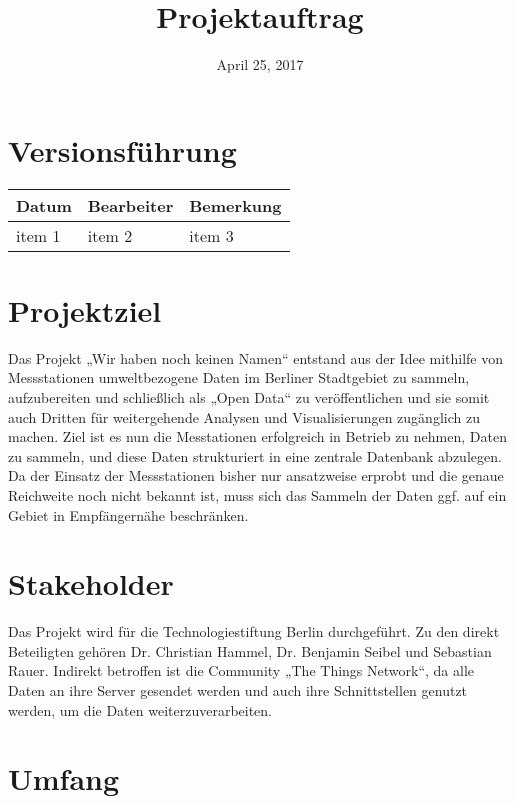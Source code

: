 \documentclass[
11pt,
a4paper,
ngerman,
tablecaptionabove
]{article}
\title{Projektauftrag}
\author{Mark Otto \and }
\date{April 25, 2017}
\begin{document}
\begin{titlepage}
\centering
\maketitle
\end{titlepage}

\tableofcontents
\listoffigures
\listoftables

\section{Versionsführung}
\begin{tabularx}{\textwidth}{ |X|X|X| }
  \hline
	\textbf{ Datum } & \textbf{ Bearbeiter } & \textbf{ Bemerkung } \\
  \hline 
  item 1  & item 2  & item 3 \\
  \hline
\end{tabularx}

\section{Projektziel}
Das Projekt „Wir haben noch keinen Namen“ entstand aus der Idee mithilfe von Messstationen umweltbezogene Daten im Berliner Stadtgebiet zu sammeln, aufzubereiten und schließlich als „Open Data“ zu veröffentlichen und sie somit auch Dritten für weitergehende Analysen und Visualisierungen zugänglich zu machen.
Ziel ist es nun die Messtationen erfolgreich in Betrieb zu nehmen, Daten zu sammeln, und diese Daten strukturiert in eine zentrale Datenbank abzulegen.
Da der Einsatz der Messstationen bisher nur ansatzweise erprobt und die genaue Reichweite noch nicht bekannt ist, muss sich das Sammeln der Daten ggf. auf ein Gebiet in Empfängernähe beschränken.

\section{Stakeholder}
Das Projekt wird für die Technologiestiftung Berlin durchgeführt. Zu den direkt Beteiligten gehören Dr. Christian Hammel, Dr. Benjamin Seibel und Sebastian Rauer.
Indirekt betroffen ist die Community „The Things Network“, da alle Daten an ihre Server gesendet werden und auch ihre Schnittstellen genutzt werden, um die Daten weiterzuverarbeiten.

\section{Umfang}
\end{document}
